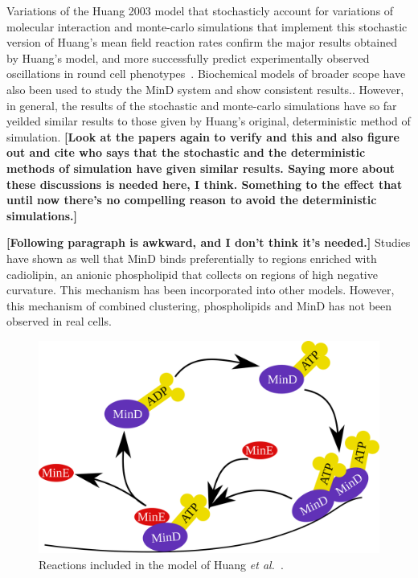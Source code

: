 \documentclass[letterpaper,twocolumn,amsmath,amssymb,pre]{revtex4-1}
\newcommand{\red}[1]{{\bf \color{red} #1}}
\newcommand{\fixme}[1]{\red{[#1]}}
\begin{document}
Variations of the Huang 2003 model that stochasticly account for
variations of molecular interaction \cite{fange2006noise} and
monte-carlo simulations that implement this stochastic version of
Huang's mean field reaction rates confirm the major results obtained
by Huang's model, and more successfully predict experimentally
observed oscillations in round cell
phenotypes~\cite{drew2005polymerization, fange2006noise,
  huang2004min}. Biochemical models of broader scope have also been
used to study the MinD system and show consistent
results.\cite{arjunan2010new}.  However, in general, the results of
the stochastic and monte-carlo simulations have so far yeilded similar
results to those given by Huang's original, deterministic method of
simulation.\fixme{Look at the papers again to verify and this and also
  figure out and cite who says that the stochastic and the
  deterministic methods of simulation have given similar results.
  Saying more about these discussions is needed here, I think.
  Something to the effect that until now there's no compelling reason
  to avoid the deterministic simulations.}

\fixme{Following paragraph is awkward, and I don't think it's needed.}
Studies have shown as well that MinD binds preferentially to regions
enriched with cadiolipin, an anionic phospholipid that collects on
regions of high negative curvature. This mechanism has been
incorporated into other
models.\cite{drew2005polymerization,cytrynbaum2007multistranded,renner2012mind,renner2012mind}
However, this mechanism of combined clustering, phospholipids and MinD
has not been observed in real cells. \cite{halatek2012highly}


\begin{figure}
  \includegraphics[width=\columnwidth]{reactions}
  \caption{Reactions included in the model of Huang \emph{et
      al.}~\cite{huang2003dynamic}.}\label{fig:reactions}
\end{figure}
\end{document}
